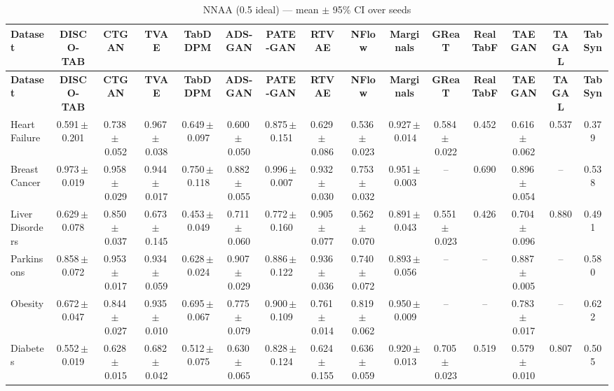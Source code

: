\documentclass[8pt]{extarticle}
\begin{document}
\begin{longtable}{l*{14}{c}}
\caption{NNAA (0.5 ideal) --- mean $\pm$ 95\% CI over seeds}\\
\toprule
\textbf{Dataset} & \textbf{DISCO-TAB} & \textbf{CTGAN} & \textbf{TVAE} & \textbf{TabDDPM} & \textbf{ADS-GAN} & \textbf{PATE-GAN} & \textbf{RTVAE} & \textbf{NFlow} & \textbf{Marginals} & \textbf{GReaT} & \textbf{RealTabF} & \textbf{TAEGAN} & \textbf{TAGAL} & \textbf{TabSyn} \\
\midrule
\endfirsthead
\toprule
\textbf{Dataset} & \textbf{DISCO-TAB} & \textbf{CTGAN} & \textbf{TVAE} & \textbf{TabDDPM} & \textbf{ADS-GAN} & \textbf{PATE-GAN} & \textbf{RTVAE} & \textbf{NFlow} & \textbf{Marginals} & \textbf{GReaT} & \textbf{RealTabF} & \textbf{TAEGAN} & \textbf{TAGAL} & \textbf{TabSyn} \\
\midrule
\endhead
\bottomrule
\endfoot
Heart Failure & 0.591\,$\pm$\,0.201 & 0.738\,$\pm$\,0.052 & 0.967\,$\pm$\,0.038 & 0.649\,$\pm$\,0.097 & 0.600\,$\pm$\,0.050 & 0.875\,$\pm$\,0.151 & 0.629\,$\pm$\,0.086 & 0.536\,$\pm$\,0.023 & 0.927\,$\pm$\,0.014 & 0.584\,$\pm$\,0.022 & 0.452 & 0.616\,$\pm$\,0.062 & 0.537 & 0.379 \\
Breast Cancer & 0.973\,$\pm$\,0.019 & 0.958\,$\pm$\,0.029 & 0.944\,$\pm$\,0.017 & 0.750\,$\pm$\,0.118 & 0.882\,$\pm$\,0.055 & 0.996\,$\pm$\,0.007 & 0.932\,$\pm$\,0.030 & 0.753\,$\pm$\,0.032 & 0.951\,$\pm$\,0.003 & -- & 0.690 & 0.896\,$\pm$\,0.054 & -- & 0.538 \\
Liver Disorders & 0.629\,$\pm$\,0.078 & 0.850\,$\pm$\,0.037 & 0.673\,$\pm$\,0.145 & 0.453\,$\pm$\,0.049 & 0.711\,$\pm$\,0.060 & 0.772\,$\pm$\,0.160 & 0.905\,$\pm$\,0.077 & 0.562\,$\pm$\,0.070 & 0.891\,$\pm$\,0.043 & 0.551\,$\pm$\,0.023 & 0.426 & 0.704\,$\pm$\,0.096 & 0.880 & 0.491 \\
Parkinsons & 0.858\,$\pm$\,0.072 & 0.953\,$\pm$\,0.017 & 0.934\,$\pm$\,0.059 & 0.628\,$\pm$\,0.024 & 0.907\,$\pm$\,0.029 & 0.886\,$\pm$\,0.122 & 0.936\,$\pm$\,0.036 & 0.740\,$\pm$\,0.072 & 0.893\,$\pm$\,0.056 & -- & -- & 0.887\,$\pm$\,0.005 & -- & 0.580 \\
Obesity & 0.672\,$\pm$\,0.047 & 0.844\,$\pm$\,0.027 & 0.935\,$\pm$\,0.010 & 0.695\,$\pm$\,0.067 & 0.775\,$\pm$\,0.079 & 0.900\,$\pm$\,0.109 & 0.761\,$\pm$\,0.014 & 0.819\,$\pm$\,0.062 & 0.950\,$\pm$\,0.009 & -- & -- & 0.783\,$\pm$\,0.017 & -- & 0.622 \\
Diabetes & 0.552\,$\pm$\,0.019 & 0.628\,$\pm$\,0.015 & 0.682\,$\pm$\,0.042 & 0.512\,$\pm$\,0.075 & 0.630\,$\pm$\,0.065 & 0.828\,$\pm$\,0.124 & 0.624\,$\pm$\,0.155 & 0.636\,$\pm$\,0.059 & 0.920\,$\pm$\,0.013 & 0.705\,$\pm$\,0.023 & 0.519 & 0.579\,$\pm$\,0.010 & 0.807 & 0.505 \\

\end{longtable}
\end{document}

